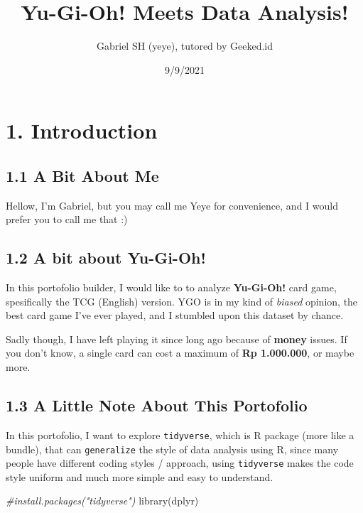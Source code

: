\documentclass[
]{article}
\title{Yu-Gi-Oh! Meets Data Analysis!}
\author{Gabriel SH (yeye), tutored by Geeked.id}
\date{9/9/2021}
\newenvironment{Shaded}{\begin{snugshade}}{\end{snugshade}}
\newcommand{\CommentTok}[1]{\textcolor[rgb]{0.56,0.35,0.01}{\textit{#1}}}
\newcommand{\FunctionTok}[1]{\textcolor[rgb]{0.00,0.00,0.00}{#1}}
\newcommand{\NormalTok}[1]{#1}
\begin{document}
\maketitle

{
\setcounter{tocdepth}{2}
\tableofcontents
}
\hypertarget{introduction}{%
\section{1. Introduction}\label{introduction}}

\hypertarget{a-bit-about-me}{%
\subsection{1.1 A Bit About Me}\label{a-bit-about-me}}

Hellow, I'm Gabriel, but you may call me Yeye for convenience, and I
would prefer you to call me that :)

\hypertarget{a-bit-about-yu-gi-oh}{%
\subsection{1.2 A bit about Yu-Gi-Oh!}\label{a-bit-about-yu-gi-oh}}

In this portofolio builder, I would like to to analyze
\textbf{Yu-Gi-Oh!} card game, spesifically the TCG (English) version.
YGO is in my kind of \emph{biased} opinion, the best card game I've ever
played, and I stumbled upon this dataset by chance.

Sadly though, I have left playing it since long ago because of
\textbf{money} issues. If you don't know, a single card can cost a
maximum of \textbf{Rp 1.000.000}, or maybe more.

\hypertarget{a-little-note-about-this-portofolio}{%
\subsection{1.3 A Little Note About This
Portofolio}\label{a-little-note-about-this-portofolio}}

In this portofolio, I want to explore \texttt{tidyverse}, which is R
package (more like a bundle), that can \texttt{generalize} the style of
data analysis using R, since many people have different coding styles /
approach, using \texttt{tidyverse} makes the code style uniform and much
more simple and easy to understand.

\begin{Shaded}
\begin{Highlighting}[]
\CommentTok{\#install.packages("tidyverse")}
\FunctionTok{library}\NormalTok{(dplyr)}
\end{Highlighting}
\end{Shaded}
\end{document}
